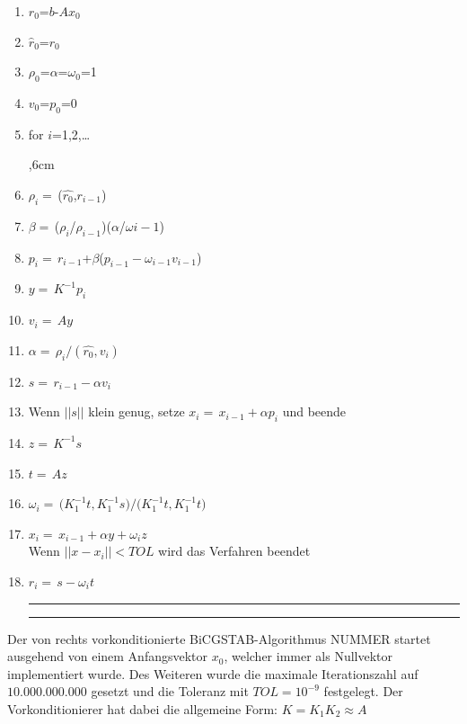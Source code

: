\begin{enumerate}
	\setlength{\itemsep}{-6pt}
\hrule\hrule
	
	
	\item $r_0$=$b$-$A$$x_0$
	\item $\hat{r}_0$=$r_0$
	\item $\rho_0$=$\alpha$=$\omega_0$=1
	\item $v_0$=$p_0$=0
	\item for $i$=1,2,\dots
	\par
	\begingroup
	,6cm 
	\noindent 
	\item$\rho_i=$\,($\hat{r_0}$,$r_{i-1}$)
	\item$\beta=$\,($\rho_i$/$\rho_{i-1}$)($\alpha$/$\omega{i-1}$)
	\item$p_i=$\,$r_{i-1}$+$\beta$($p_{i-1}-\omega_{i-1}v_{i-1}$)	
	\item$y=$\,$K^{-1}p_i$
	\item$v_i=$\,$Ay$
	\item$\alpha=$\,$\rho_i/(\hat{r_0},v_i)$
	\item$s=$\,$r_{i-1}-\alpha$$v_i$
	\item Wenn $||s||$ klein genug, setze $x_i=$\,$x_{i-1}+\alpha$$p_i$ und beende 
	\item$z=$\,$K^{-1}s$
	\item$t=$\,$Az$
	\item$\omega_i=$\,$(K^{-1}_1$$t,K^{-1}_1$$s)/(K^{-1}_1$$t,K^{-1}_1$$t)$ 
	\item$x_i=$\,$x_{i-1}+\alpha$$y+\omega_i$$z$\\
	Wenn $||x-x_i|| < TOL $ wird das Verfahren beendet 
	\item$r_i=$\,$s-\omega_i$$t$\\
	
	\hrule\hrule
	\par
	\endgroup 
	
\end{enumerate}



Der von rechts vorkonditionierte BiCGSTAB-Algorithmus NUMMER startet ausgehend von einem Anfangsvektor $x_0$, welcher immer als Nullvektor implementiert wurde. Des Weiteren wurde die maximale Iterationszahl auf $10.000.000.000$ gesetzt und die Toleranz mit $TOL= 10^{-9}$ festgelegt. Der Vorkonditionierer hat dabei die allgemeine Form: 
$K = K_1 K_2 \approx A $
